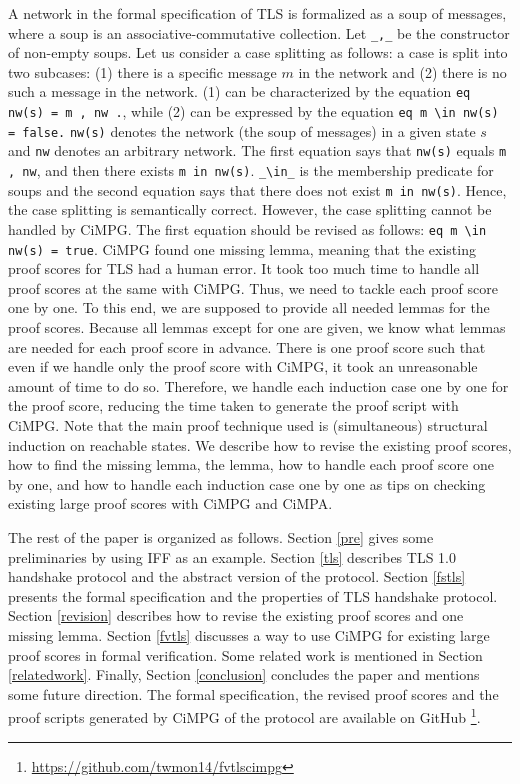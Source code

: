 \documentclass[a4paper,fleqn]{cas-dc}
\begin{document}
A network in the formal specification of TLS is formalized as a soup of messages, where a soup is an associative-commutative collection. Let \verb|_,_| be the constructor of non-empty soups. Let us consider a case splitting as follows: a case is split into two subcases: (1) there is a specific message $m$ in the network and (2) there is no such a message in the network. (1) can be characterized by the equation \verb!eq nw(s) = m , nw .!, while (2) can be expressed by the equation \verb!eq m \in nw(s) = false.! \verb!nw(s)! denotes the network (the soup of messages) in a given state $s$ and \verb!nw! denotes an arbitrary network. The first equation says that \verb!nw(s)! equals \verb!m , nw!, and then there exists \verb!m in nw(s)!. \verb|_\in_| is the membership predicate for soups and the second equation says that there does not exist \verb!m in nw(s)!. Hence, the case splitting is semantically correct. However, the case splitting cannot be handled by CiMPG. The first equation should be revised as follows: 
\verb!eq m \in nw(s) = true!. CiMPG found one missing lemma, meaning that the existing proof scores for TLS had a human error. It took too much time to handle all proof scores at the same with CiMPG. Thus, we need to tackle each proof score one by one. To this end, we are supposed to provide all needed lemmas for the proof scores. Because all lemmas except for one are given, we know what lemmas are needed for each proof score in advance. There is one proof score such that even if we handle only the proof score with CiMPG, it took an unreasonable amount of time to do so. Therefore, we handle each induction case one by one for the proof score, reducing the time taken to generate the proof script with CiMPG. Note that the main proof technique used is (simultaneous) structural induction on reachable states. We describe how to revise the existing proof scores, how to find the missing lemma, the lemma, how to handle each proof score one by one, and how to handle each induction case one by one as tips on checking existing large proof scores with CiMPG and CiMPA.


The rest of the paper is organized as follows. Section \ref{pre} gives some preliminaries by using IFF as an example. Section \ref{tls} describes TLS 1.0 handshake protocol and the abstract version of the protocol. Section \ref{fstls} presents the formal specification and the properties of TLS handshake protocol.
Section \ref{revision} describes how to revise the existing proof scores and one missing lemma. Section \ref{fvtls} discusses a way to use CiMPG for existing large proof scores in formal verification. Some related work is mentioned in Section \ref{relatedwork}. Finally, Section \ref{conclusion} concludes the paper and mentions some future direction. 
The formal specification, the revised proof scores and the proof scripts generated by CiMPG of the protocol are available on GitHub \footnote{\url{https://github.com/twmon14/fvtlscimpg}}.
\end{document}
